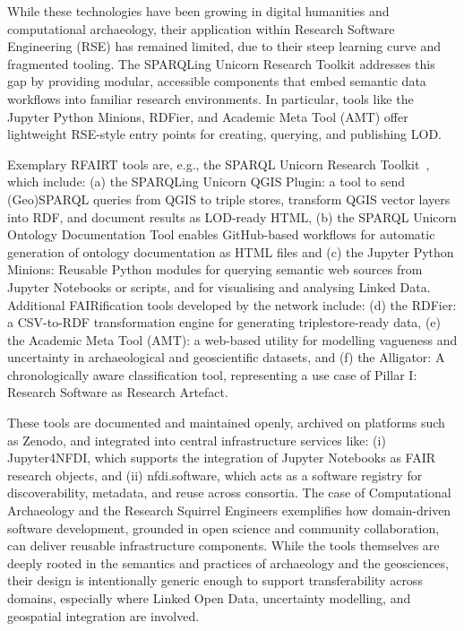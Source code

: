 \documentclass{eceasst}
\begin{document}
While these technologies have been growing in digital humanities and computational archaeology, their application within Research Software Engineering (RSE) has remained limited, due to their steep learning curve and fragmented tooling. The SPARQLing Unicorn Research Toolkit addresses this gap by providing modular, accessible components that embed semantic data workflows into familiar research environments. In particular, tools like the Jupyter Python Minions, RDFier, and Academic Meta Tool (AMT) offer lightweight RSE-style entry points for creating, querying, and publishing LOD.

Exemplary RFAIRT tools are, e.g., the SPARQL Unicorn Research Toolkit~\cite{thiery_research_2025}, which include: (a) the SPARQLing Unicorn QGIS Plugin: a tool to send (Geo)SPARQL queries from QGIS to triple stores, transform QGIS vector layers into RDF, and document results as LOD-ready HTML, (b) the SPARQL Unicorn Ontology Documentation Tool enables GitHub-based workflows for automatic generation of ontology documentation as HTML files and (c) the Jupyter Python Minions: Reusable Python modules for querying semantic web sources from Jupyter Notebooks or scripts, and for visualising and analysing Linked Data. Additional FAIRification tools developed by the network include: (d) the RDFier: a CSV-to-RDF transformation engine for generating triplestore-ready data, (e) the Academic Meta Tool (AMT): a web-based utility for modelling vagueness and uncertainty in archaeological and geoscientific datasets, and (f) the Alligator: A chronologically aware classification tool, representing a use case of Pillar I: Research Software as Research Artefact.

These tools are documented and maintained openly, archived on platforms such as Zenodo, and integrated into central infrastructure services like: (i) Jupyter4NFDI, which supports the integration of Jupyter Notebooks as FAIR research objects, and (ii) nfdi.software, which acts as a software registry for discoverability, metadata, and reuse across consortia. The case of Computational Archaeology and the Research Squirrel Engineers exemplifies how domain-driven software development, grounded in open science and community collaboration, can deliver reusable infrastructure components. While the tools themselves are deeply rooted in the semantics and practices of archaeology and the geosciences, their design is intentionally generic enough to support transferability across domains, especially where Linked Open Data, uncertainty modelling, and geospatial integration are involved.
\end{document}

